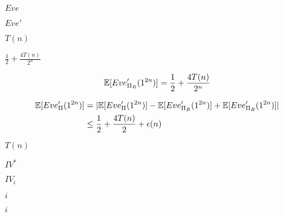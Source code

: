 \documentclass[10pt]{book}
\begin{document}
\begin{mdSnippets}
\begin{mdInlineSnippet}%
$Eve$\end{mdInlineSnippet}%
\begin{mdInlineSnippet}[0c3570ae86ed9d695d5d1d469a0b8bfa]%
$Eve'$\end{mdInlineSnippet}%
\begin{mdInlineSnippet}[514884be093e9ab7909b0d394e7b74d2]%
$T(n)$\end{mdInlineSnippet}%
\begin{mdInlineSnippet}[6d34ec322565211b4ca98714358f5e98]%
$\frac{1}{2} + \frac{4T(n)}{2^n}$\end{mdInlineSnippet}%
\begin{mdDisplaySnippet}[d7c5245954dfceffbd1f6a652a7e6136]%
\[%
\E[Eve'_{\Pi_R}(1^{2n})] = \frac{1}{2} + \frac{4T(n)}{2^n}
\]%
\end{mdDisplaySnippet}%
\begin{mdDisplaySnippet}[2e63b240624fa3b4c93345b802d38968]%
\[%
\begin{aligned}
\E[Eve'_{\Pi}(1^{2n})] &= |\E[Eve'_{\Pi}(1^{2n})]  - \E[Eve'_{\Pi_R}(1^{2n})] + \E[Eve'_{\Pi_R}(1^{2n})]  | \\
&\leq \frac{1}{2} + \frac{4T(n)}{2} + \epsilon(n)
\end{aligned}
\]%
\end{mdDisplaySnippet}%
\begin{mdInlineSnippet}[514884be093e9ab7909b0d394e7b74d2]%
$T(n)$\end{mdInlineSnippet}%
\begin{mdInlineSnippet}%
$IV^*$\end{mdInlineSnippet}%
\begin{mdInlineSnippet}[a672259312fe8429e1475b84f7397226]%
$IV_i$\end{mdInlineSnippet}%
\begin{mdInlineSnippet}[865c0c0b4ab0e063e5caa3387c1a8741]%
$i$\end{mdInlineSnippet}%
\begin{mdInlineSnippet}[865c0c0b4ab0e063e5caa3387c1a8741]%
$i$\end{mdInlineSnippet}%
\begin{mdInlineSnippet}%

\end{mdInlineSnippet}
\end{mdSnippets}
\end{document}
